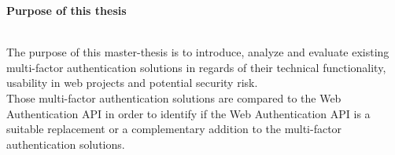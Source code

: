 \thispagestyle{empty}

\begin{large}
	\textbf{Purpose of this thesis} \\ \\
\end{large}
The purpose of this master-thesis is to introduce, analyze and evaluate existing multi-factor authentication solutions in regards of their technical functionality, usability in web projects and potential security risk.\\
Those multi-factor authentication solutions are compared to the Web Authentication API in order to identify if the Web Authentication API is a suitable replacement or a complementary addition to the multi-factor authentication solutions.
\newpage

